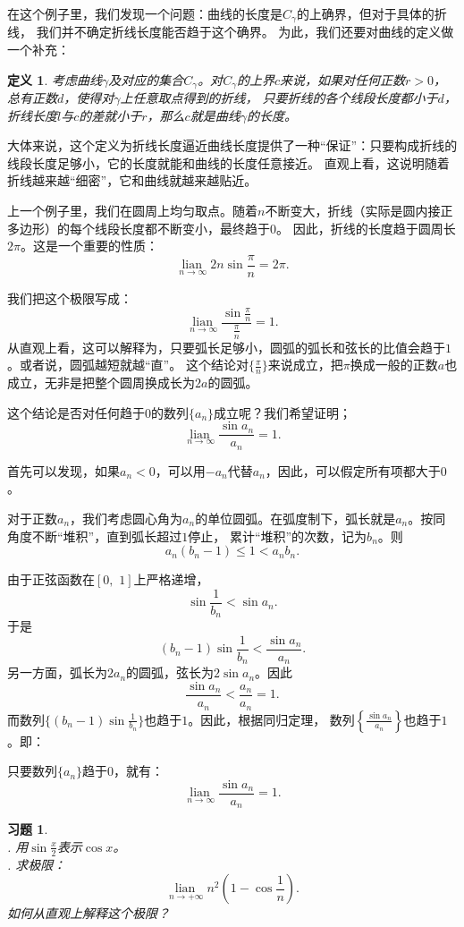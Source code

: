 \documentclass[12pt,UTF8]{ctexbook}
\newcommand{\lian}[1]{
    \underset{#1}{\operatorname{lian}\,}
}
\newtheorem{df}{定义}[section]
\newtheorem{xt}{习题}[section]
\begin{document}
在这个例子里，我们发现一个问题：曲线的长度是$C_\gamma$的上确界，但对于具体的折线，
我们并不确定折线长度能否趋于这个确界。
为此，我们还要对曲线的定义做一个补充：
\begin{df}
    考虑曲线$\gamma$及对应的集合$C_\gamma$。对$C_\gamma$的上界$c$来说，如果对任何正数$r>0$，总有正数$d$，使得对$\gamma$上任意取点得到的折线，
    只要折线的各个线段长度都小于$d$，折线长度$l$与$c$的差就小于$r$，那么$c$就是曲线$\gamma$的长度。
\end{df}

大体来说，这个定义为折线长度逼近曲线长度提供了一种“保证”：只要构成折线的线段长度足够小，它的长度就能和曲线的长度任意接近。
直观上看，这说明随着折线越来越“细密”，它和曲线就越来越贴近。

上一个例子里，我们在圆周上均匀取点。随着$n$不断变大，折线（实际是圆内接正多边形）的每个线段长度都不断变小，最终趋于$0$。
因此，折线的长度趋于圆周长$2\pi$。这是一个重要的性质：
$$ \lian{n\to\infty} 2n\sin{\frac{\pi}{n}} = 2\pi.$$

我们把这个极限写成：
$$ \lian{n\to\infty} \frac{\sin{\frac{\pi}{n}}}{\frac{\pi}{n}} = 1. $$
从直观上看，这可以解释为，只要弧长足够小，圆弧的弧长和弦长的比值会趋于$1$。或者说，圆弧越短就越“直”。
这个结论对$\{\frac{\pi}{n}\}$来说成立，把$\pi$换成一般的正数$a$也成立，无非是把整个圆周换成长为$2a$的圆弧。

这个结论是否对任何趋于$0$的数列$\{a_n\}$成立呢？我们希望证明；
$$ \lian{n\to\infty} \frac{\sin{a_n}}{a_n} = 1. $$

首先可以发现，如果$a_n<0$，可以用$-a_n$代替$a_n$，因此，可以假定所有项都大于$0$。

对于正数$a_n$，我们考虑圆心角为$a_n$的单位圆弧。在弧度制下，弧长就是$a_n$。按同角度不断“堆积”，直到弧长超过$1$停止，
累计“堆积”的次数，记为$b_n$。则
$$ a_n(b_n - 1) \leqslant 1 < a_nb_n. $$

由于正弦函数在$[0,\,\,1]$上严格递增，
$$\sin{\frac{1}{b_n}} < \sin{a_n}. $$
于是
$$ (b_n - 1)\sin{\frac{1}{b_n}} < \frac{\sin{a_n}}{a_n}.$$
另一方面，弧长为$2a_n$的圆弧，弦长为$2\sin{a_n}$。因此
$$\frac{\sin{a_n}}{a_n} < \frac{a_n}{a_n} = 1.$$
而数列$\{(b_n - 1)\sin{\frac{1}{b_n}}\}$也趋于$1$。因此，根据同归定理，
数列$ \left\{\frac{\sin{a_n}}{a_n}\right\}$也趋于$1$。即：

只要数列$\{a_n\}$趋于$0$，就有：
$$ \lian{n\to\infty} \frac{\sin{a_n}}{a_n} = 1. $$

\begin{xt}
    \mbox{} \\
    . 用$\sin{\frac{x}{2}}$表示$\cos{x}$。\\
    . 求极限：
    $$ \lian{n\to +\infty} n^2\left(1 - \cos{\frac{1}{n}}\right).$$
    \indent 如何从直观上解释这个极限？
\end{xt}
\end{document}
